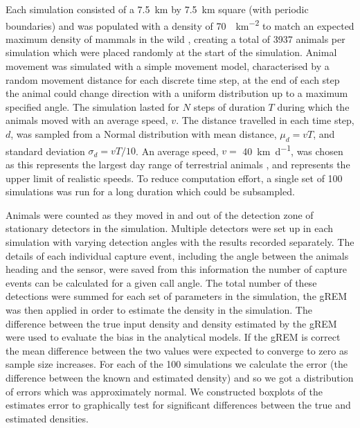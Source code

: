 \documentclass[a4paper,10pt,reqno,oneside]{amsart}
\begin{document}
Each simulation consisted of a  \SI{7.5}{\kilo\meter} by \SI{7.5}{\kilo\meter} square (with periodic boundaries) and was populated with a density of \SI{70}{\animals\per\kilo\meter\squared} to match an expected maximum density of mammals in the wild \citep{damuth1981population}, creating a total of 3937 animals per simulation which were placed randomly at the start of the simulation. Animal movement was simulated with a simple movement model, characterised by a random movement distance for each discrete time step, at the end of each step the animal could change direction with a uniform distribution up to a maximum specified angle. The simulation lasted for $N$ steps of duration $T$ during which the animals moved with an average speed, $v$. The distance travelled in each time step, $d$, was sampled from a Normal distribution with mean distance, $\mu_d = vT$,  and standard deviation $\sigma_d = vT/10$. An average speed, $v = $ \SI{40}{\kilo\meter \per \day}, was chosen as this represents the largest day range of terrestrial animals \citep{carbone2005far}, and represents the upper limit of realistic speeds. To reduce computation effort, a single set of 100 simulations was run for a long duration which could be subsampled. 


Animals were counted as they moved in and out of the detection zone of stationary detectors in the simulation. Multiple detectors were set up in each simulation with varying detection angles with the results recorded separately. The details of each individual capture event, including the angle between the animals heading and the sensor, were saved from this information the number of capture events can be calculated for a given call angle. The total number of these detections were summed for each set of parameters in the simulation, the gREM was then applied in order to estimate the density in the simulation. The difference between the true input density and density estimated by the gREM were used to evaluate the bias in the analytical models. If the gREM is correct the mean difference between the two values were expected to converge to zero as sample size increases. For each of the 100 simulations we calculate the error (the difference between the known and estimated density) and so we got a distribution of errors which was approximately normal. We constructed boxplots of the estimates error to graphically test for significant differences between the true and estimated densities. 
\end{document}
